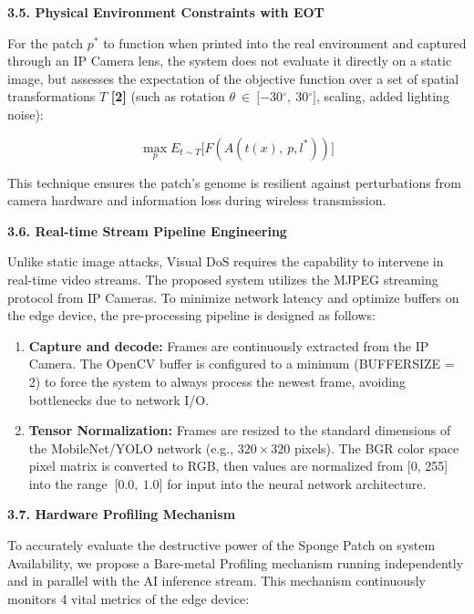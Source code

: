 \documentclass[]{article}
\begin{document}
\textbf{3.5. Physical Environment Constraints with EOT}

For the patch \(p^{*}\) to function when printed into the real environment and captured through an IP Camera lens, the system does not evaluate it directly on a static image, but assesses the expectation of the objective function over a set of spatial transformations \(T\) \textbf{{[}2{]}} (such as rotation \(\theta\  \in \ \lbrack - 30{^\circ},\ 30{^\circ}\rbrack\), scaling, added lighting noise):

\[\max_{p}E_{t\sim T}\lbrack F(A(t(x),\ p,l^{*}))\rbrack\]

This technique ensures the patch's genome is resilient against perturbations from camera hardware and information loss during wireless transmission.\textbf{\hfill\break
}

\textbf{3.6. Real-time Stream Pipeline Engineering}

Unlike static image attacks, Visual DoS requires the capability to intervene in real-time video streams. The proposed system utilizes the MJPEG streaming protocol from IP Cameras. To minimize network latency and optimize buffers on the edge device, the pre-processing pipeline is designed as follows:

\begin{enumerate}
\def\labelenumi{\arabic{enumi}.}
\item
  \textbf{Capture and decode:} Frames are continuously extracted from the IP Camera. The OpenCV buffer is configured to a minimum (BUFFERSIZE = 2) to force the system to always process the newest frame, avoiding bottlenecks due to network I/O.
\item
  \textbf{Tensor Normalization:} Frames are resized to the standard dimensions of the MobileNet/YOLO network (e.g., \(320 \times 320\) pixels). The BGR color space pixel matrix is converted to RGB, then values are normalized from {[}0, 255{]} into the range \(\ \lbrack 0.0,\ 1.0\rbrack\) for input into the neural network architecture.
\end{enumerate}

\textbf{3.7. Hardware Profiling Mechanism}

To accurately evaluate the destructive power of the Sponge Patch on system Availability, we propose a Bare-metal Profiling mechanism running independently and in parallel with the AI inference stream. This mechanism continuously monitors 4 vital metrics of the edge device:
\end{document}
